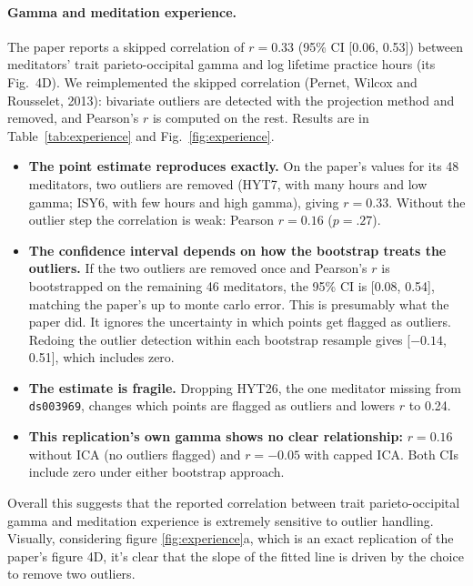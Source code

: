 \documentclass[10pt,a4paper]{article}
\begin{document}
\paragraph{Gamma and meditation experience.} The paper reports a skipped correlation of $r = 0.33$
(95\% CI [0.06, 0.53]) between meditators' trait parieto-occipital gamma and log lifetime practice hours (its
Fig.~4D). We reimplemented the skipped correlation (Pernet, Wilcox and Rousselet, 2013): bivariate outliers are
detected with the projection method and removed, and Pearson's $r$ is computed on the rest. Results are in
Table~\ref{tab:experience} and Fig.~\ref{fig:experience}.
\begin{itemize}
  \item \textbf{The point estimate reproduces exactly.} On the paper's values for its 48 meditators, two outliers
        are removed (HYT7, with many hours and low gamma; ISY6, with few hours and high gamma), giving $r = 0.33$.
        Without the outlier step the correlation is weak: Pearson $r = 0.16$ ($p = .27$).
  \item \textbf{The confidence interval depends on how the bootstrap treats the outliers.} If the two outliers are
        removed once and Pearson's $r$ is bootstrapped on the remaining 46 meditators, the 95\% CI is [0.08, 0.54],
        matching the paper's up to monte carlo error. This is presumably what the paper did. 
        It ignores the uncertainty in which points get flagged as outliers. Redoing the outlier detection within 
        each bootstrap resample gives [$-0.14$, 0.51],
        which includes zero.
  \item \textbf{The estimate is fragile.} Dropping HYT26, the one meditator missing from \texttt{ds003969},
        changes which points are flagged as outliers and lowers $r$ to 0.24.
  \item \textbf{This replication's own gamma shows no clear relationship:} $r = 0.16$ without ICA (no outliers
        flagged) and $r = -0.05$ with capped ICA. Both CIs include zero under either bootstrap approach.
\end{itemize}

Overall this suggests that the reported correlation between trait parieto-occipital gamma and 
meditation experience is extremely sensitive to outlier handling. Visually, considering figure \ref{fig:experience}a, 
which is an exact replication of the paper's figure 4D, it's clear that the slope of the fitted
line is driven by the choice to remove two outliers.
\end{document}
